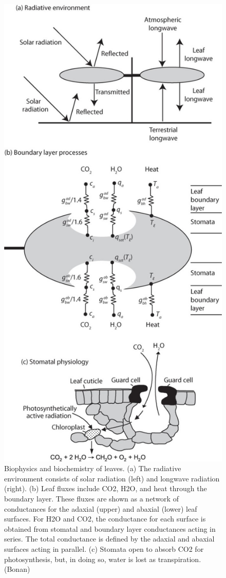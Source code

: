 \documentclass[12pt,oneside]{book}
\begin{document}
\begin{figure}

{\centering \includegraphics[width=0.8\linewidth]{figures/chap3/f331_leaf_E_balance} 

}

\caption{Biophysics and biochemistry of leaves. (a) The radiative environment consists of solar radiation (left) and longwave radiation (right). (b) Leaf fluxes include CO2, H2O, and heat through the boundary layer. These fluxes are shown as a network of conductances for the adaxial (upper) and abaxial (lower) leaf surfaces. For H2O and CO2, the conductance for each surface is obtained from stomatal and boundary layer conductances acting in series. The total conductance is defined by the adaxial and abaxial surfaces acting in parallel. (c) Stomata open to absorb CO2 for photosynthesis, but, in doing so, water is lost as transpiration. (Bonan)}\label{fig:f331}
\end{figure}
\end{document}
